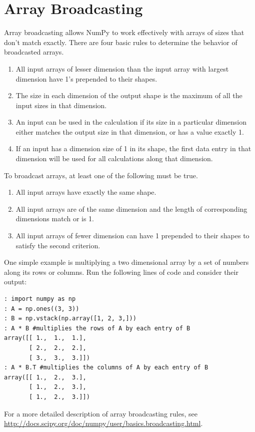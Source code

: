 \section*{Array Broadcasting}
Array broadcasting allows NumPy to work effectively with arrays of sizes that don't match exactly.
There are four basic rules to determine the behavior of broadcasted arrays.
\begin{enumerate}
\item All input arrays of lesser dimension than the input array with largest dimension have 1's prepended to their shapes.
\item The size in each dimension of the output shape is the maximum of all the input sizes in that dimension.
\item An input can be used in the calculation if its size in a particular dimension either matches the output size in that dimension, or has a value exactly 1.
\item If an input has a dimension size of 1 in its shape, the first data entry in that dimension will be used for all calculations along that dimension.
\end{enumerate}
To broadcast arrays, at least one of the following must be true.
\begin{enumerate}
\item All input arrays have exactly the same shape.
\item All input arrays are of the same dimension and the length of corresponding dimensions match or is 1.
\item All input arrays of fewer dimension can have 1 prepended to their shapes to satisfy the second criterion.
\end{enumerate}

One simple example is multiplying a two dimensional array by a set of numbers along its rows or columns.
Run the following lines of code and consider their output:
\begin{lstlisting}
: import numpy as np
: A = np.ones((3, 3))
: B = np.vstack(np.array([1, 2, 3,]))
: A * B #multiplies the rows of A by each entry of B
array([[ 1.,  1.,  1.],
       [ 2.,  2.,  2.],
       [ 3.,  3.,  3.]])
: A * B.T #multiplies the columns of A by each entry of B
array([[ 1.,  2.,  3.],
       [ 1.,  2.,  3.],
       [ 1.,  2.,  3.]])
\end{lstlisting}

For a more detailed description of array broadcasting rules, see \url{http://docs.scipy.org/doc/numpy/user/basics.broadcasting.html}.

